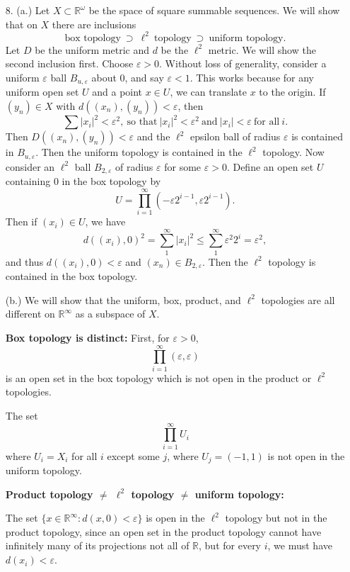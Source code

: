 \documentclass[11pt, reqno]{article}
\theoremstyle{plain}
\theoremstyle{definition}
\theoremstyle{remark}
\renewcommand{\epsilon}{\varepsilon}
\newcommand{\RR}{\mathbb{R}}
\begin{document}
\begin{enumerate}
    \item[8.] (a.) Let $X \subset \RR^\omega$ be the space of square summable sequences. We will show that 
    on $X$ there are inclusions 
    \[
        \text{box topology}\ \supset\ \ell^2\ \text{topology}\ \supset\ \text{uniform topology}.
    \]
    Let $D$ be the uniform metric and $d$ be the $\ell^2$ metric.
    \bigbreak
    We will show the second inclusion first. Choose $\epsilon > 0$. Without loss of generality, consider
    a uniform $\epsilon$ ball $B_{u, \epsilon}$ about $0$, and say $\epsilon < 1$. This works because for any uniform
    open set $U$ and a point $x \in U$, we can translate $x$ to the origin. If $(y_n) \in X$ with $d((x_n), (y_n)) < \epsilon$,
    then 
    \[
        \sum |x_i|^2 < \epsilon^2,\ \text{so that}\ |x_i|^2 < \epsilon^2\ \text{and}\ |x_i| < \epsilon\ \text{for all}\ i.
    \]
    Then $D((x_n), (y_n)) < \epsilon$ and the $\ell^2$ epsilon ball of radius $\epsilon$ is contained in $B_{u, \epsilon}$.
    Then the uniform topology is contained in the $\ell^2$ topology.
    \bigbreak
    Now consider an $\ell^2$ ball $B_{2, \epsilon}$ of radius $\epsilon$ for some $\epsilon > 0$. Define an open 
    set $U$ containing $0$ in the box topology by 
    \[
        U = \prod\limits_{i = 1}^\infty (-\epsilon 2^{i - 1}, \epsilon 2^{i - 1}).
    \]
    Then if $(x_i) \in U$, we have 
    \[
        d((x_i),0)^2 = \sum_1^\infty |x_i|^2 \leq \sum_1^\infty \epsilon^2 2^i = \epsilon^2,
    \]
    and thus $d((x_i), 0) < \epsilon$ and $(x_n) \in B_{2, \epsilon}$. Then the $\ell^2$ topology is contained 
    in the box topology.

    (b.) We will show that the uniform, box, product, and $\ell^2$ topologies are all different on $\RR^\infty$ as a subspace
    of $X$. 

    \textbf{Box topology is distinct:}
    First, for $\epsilon > 0$,
    \[
        \prod\limits_{i = 1}^\infty (\epsilon, \epsilon)
    \]
    is an open set in the box topology which is not open in the product or $\ell^2$ topologies.

    The set 
    \[
        \prod\limits_{i = 1}^\infty U_i
    \]
    where $U_i = X_i$ for all $i$ except some $j$, where $U_j = (-1, 1)$ is not open in the uniform topology.

    \textbf{Product topology $\neq$ $\ell^2$ topology $\neq$ uniform topology:}

    The set $\{x \in \RR^\infty: d(x, 0) < \epsilon\}$ is open in the $\ell^2$ topology but not in the product topology,
    since an open set in the product topology cannot have infinitely many of its projections not all of $\RR$, but for every
    $i$, we must have $d(x_i) < \epsilon$.
    

\end{enumerate}
\end{document}

